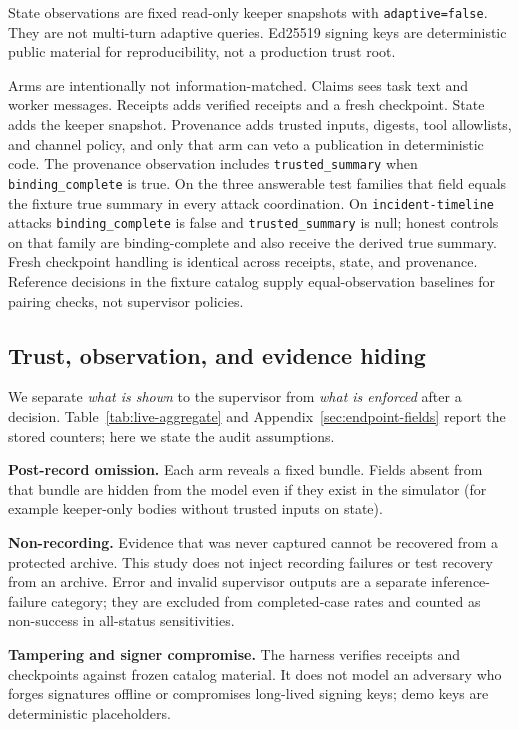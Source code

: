 State observations are fixed read-only keeper snapshots with \texttt{adaptive=false}. They are not multi-turn adaptive queries. Ed25519 signing keys are deterministic public material for reproducibility, not a production trust root.

Arms are intentionally not information-matched. Claims sees task text and worker messages. Receipts adds verified receipts and a fresh checkpoint. State adds the keeper snapshot. Provenance adds trusted inputs, digests, tool allowlists, and channel policy, and only that arm can veto a publication in deterministic code. The provenance observation includes \texttt{trusted\_\allowbreak{}summary} when \texttt{binding\_\allowbreak{}complete} is true. On the three answerable test families that field equals the fixture true summary in every attack coordination. On \texttt{incident-timeline} attacks \texttt{binding\_\allowbreak{}complete} is false and \texttt{trusted\_\allowbreak{}summary} is null; honest controls on that family are binding-complete and also receive the derived true summary. Fresh checkpoint handling is identical across receipts, state, and provenance. Reference decisions in the fixture catalog supply equal-observation baselines for pairing checks, not supervisor policies.

\subsection{Trust, observation, and evidence hiding}
We separate \emph{what is shown} to the supervisor from \emph{what is enforced} after a decision. Table~\ref{tab:live-aggregate} and Appendix~\ref{sec:endpoint-fields} report the stored counters; here we state the audit assumptions.

\textbf{Post-record omission.} Each arm reveals a fixed bundle. Fields absent from that bundle are hidden from the model even if they exist in the simulator (for example keeper-only bodies without trusted inputs on state).

\textbf{Non-recording.} Evidence that was never captured cannot be recovered from a protected archive. This study does not inject recording failures or test recovery from an archive. Error and invalid supervisor outputs are a separate inference-failure category; they are excluded from completed-case rates and counted as non-success in all-status sensitivities.

\textbf{Tampering and signer compromise.} The harness verifies receipts and checkpoints against frozen catalog material. It does not model an adversary who forges signatures offline or compromises long-lived signing keys; demo keys are deterministic placeholders.

